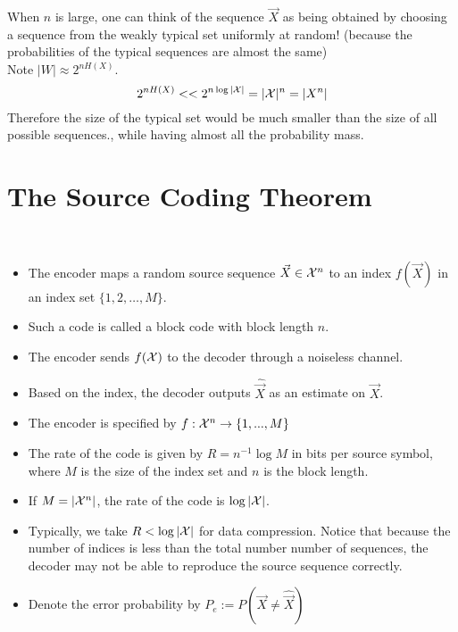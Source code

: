 \documentclass[../main.tex]{subfiles}
\begin{document}
When $n$ is large, one can think of the sequence $\vec X$ as being obtained by choosing a sequence from the weakly typical set uniformly at random! (because the probabilities of the typical sequences are almost the same)\\
Note $|W|\approx 2^{nH(X)}$.\[
2^{nH(X)} << 2^{n\log |\mathcal{X}|}= |\mathcal{X}|^n=|X^n|
\]
Therefore the size of the typical set would be much smaller than the size of all possible sequences., while having almost all the probability mass.

\section{The Source Coding Theorem}
\\
\begin{itemize}
    \item The encoder maps a random source sequence $\vec X\in \mathcal{X}^n$ to an index $f(\vec X)$ in an index set $\{1,2,\dots,M\}$.
    \item Such a code is called a block code with block length $n$.
    \item The encoder sends $f(\mathcal{X})$ to the decoder through a noiseless channel.
    \item Based on the index, the decoder outputs $\hat{\vec X}$ as an estimate on $\vec X$.
    \item The encoder is specified by $f:\mathcal{X}^n\to \{1,...,M\}$
    \item The rate of the code is given by $R=n^{-1}\log M$ in bits per source symbol, where $M$ is the size of the index set and $n$ is the block length. 
    \item If $M=|\mathcal{X}^n|$, the rate of the code is $\log |\mathcal{X}|$.
    \item Typically, we take $R < \log |\mathcal{X}|$ for data compression. Notice that because the number of indices is less than the total number number of sequences, the decoder may not be able to reproduce the source sequence correctly.
    \item Denote the error probability by $P_e := P(\vec X\neq \hat{\vec X})$
\end{itemize}
\end{document}
